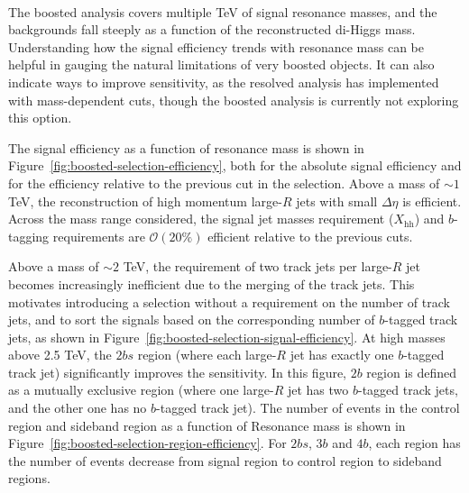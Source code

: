 \paragraph{}
The boosted analysis covers multiple TeV of signal resonance masses, and the backgrounds fall steeply as a function of the reconstructed di-Higgs mass. Understanding how the signal efficiency trends with resonance mass can be helpful in gauging the natural limitations of very boosted objects. It can also indicate ways to improve sensitivity, as the resolved analysis has implemented with mass-dependent cuts, though the boosted analysis is currently not exploring this option.

The signal efficiency as a function of resonance mass is shown in Figure~\ref{fig:boosted-selection-efficiency}, both for the absolute signal efficiency and for the efficiency relative to the previous cut in the selection. Above a mass of $\sim\!1$ TeV, the reconstruction of high momentum large-$R$ jets with small $\Delta\eta$ is efficient. Across the mass range considered, the signal jet masses requirement ($X_\text{hh}$) and $b$-tagging requirements are $\mathcal{O}(20\%)$ efficient relative to the previous cuts. 

Above a mass of $\sim\!2$ TeV, the requirement of two track jets per large-$R$ jet becomes increasingly inefficient due to the merging of the track jets. This motivates introducing a selection without a requirement on the number of track jets, and to sort the signals based on the corresponding number of $b$-tagged track jets, as shown in Figure~\ref{fig:boosted-selection-signal-efficiency}. At high masses above 2.5 TeV, the $2bs$ region (where each large-$R$ jet has exactly one $b$-tagged track jet) significantly improves the sensitivity. In this figure, $2b$ region is defined as a mutually exclusive region (where one large-$R$ jet has two $b$-tagged track jets, and the other one has no $b$-tagged track jet). The number of events in the control region and sideband region as a function of Resonance mass is shown in Figure~\ref{fig:boosted-selection-region-efficiency}. For $2bs$, $3b$ and $4b$, each region has the number of events decrease from signal region to control region to sideband regions.

